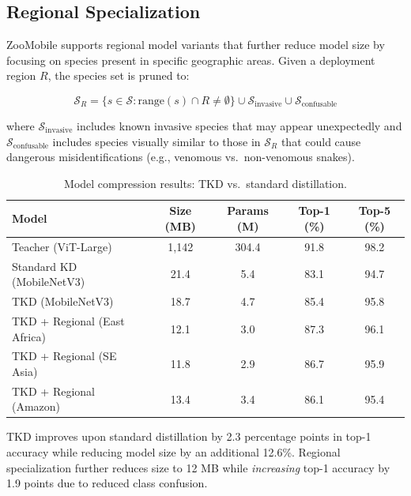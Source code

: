 \documentclass[11pt,a4paper]{article}
\begin{document}
\subsection{Regional Specialization}

ZooMobile supports regional model variants that further reduce model size by focusing on species present in specific geographic areas.
Given a deployment region $R$, the species set is pruned to:

\begin{equation}
    \mathcal{S}_R = \{s \in \mathcal{S} : \text{range}(s) \cap R \neq \emptyset\} \cup \mathcal{S}_{\text{invasive}} \cup \mathcal{S}_{\text{confusable}}
\end{equation}

\noindent where $\mathcal{S}_{\text{invasive}}$ includes known invasive species that may appear unexpectedly and $\mathcal{S}_{\text{confusable}}$ includes species visually similar to those in $\mathcal{S}_R$ that could cause dangerous misidentifications (e.g., venomous vs.\ non-venomous snakes).

\begin{table}[H]
\centering
\caption{Model compression results: TKD vs.\ standard distillation.}
\label{tab:compression}
\begin{tabular}{@{}lcccc@{}}
\toprule
\textbf{Model} & \textbf{Size (MB)} & \textbf{Params (M)} & \textbf{Top-1 (\%)} & \textbf{Top-5 (\%)} \\
\midrule
Teacher (ViT-Large) & 1,142 & 304.4 & 91.8 & 98.2 \\
Standard KD (MobileNetV3) & 21.4 & 5.4 & 83.1 & 94.7 \\
TKD (MobileNetV3) & 18.7 & 4.7 & 85.4 & 95.8 \\
TKD + Regional (East Africa) & 12.1 & 3.0 & 87.3 & 96.1 \\
TKD + Regional (SE Asia) & 11.8 & 2.9 & 86.7 & 95.9 \\
TKD + Regional (Amazon) & 13.4 & 3.4 & 86.1 & 95.4 \\
\bottomrule
\end{tabular}
\end{table}

TKD improves upon standard distillation by 2.3 percentage points in top-1 accuracy while reducing model size by an additional 12.6\%.
Regional specialization further reduces size to 12 MB while \emph{increasing} top-1 accuracy by 1.9 points due to reduced class confusion.

\end{document}
